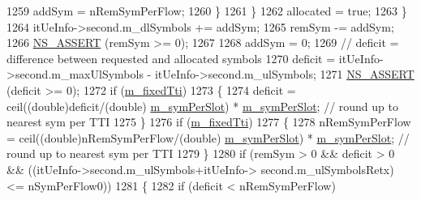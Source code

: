 \begin{DoxyCode}
1259                                                         addSym = nRemSymPerFlow;
1260                                                 \}
1261                                         \}
1262                                         allocated = \textcolor{keyword}{true};
1263                                 \}
1264                                 itUeInfo->second.m\_dlSymbols += addSym;
1265                                 remSym -= addSym;
1266                                 \hyperlink{assert_8h_a6dccdb0de9b252f60088ce281c49d052}{NS\_ASSERT} (remSym >= 0);
1267 
1268                                 addSym = 0;
1269                                 \textcolor{comment}{// deficit = difference between requested and allocated symbols}
1270                                 deficit = itUeInfo->second.m\_maxUlSymbols - itUeInfo->second.m\_ulSymbols;
1271                                 \hyperlink{assert_8h_a6dccdb0de9b252f60088ce281c49d052}{NS\_ASSERT} (deficit >= 0);
1272                                 \textcolor{keywordflow}{if} (\hyperlink{classns3_1_1MmWaveFlexTtiMacScheduler_aac44befc273f7bdb0f0be0efc3d05f34}{m\_fixedTti})
1273                                 \{
1274                                         deficit = ceil((\textcolor{keywordtype}{double})deficit/(\textcolor{keywordtype}{double})
      \hyperlink{classns3_1_1MmWaveFlexTtiMacScheduler_aa911d95e2956fcccca151a7353b8d42f}{m\_symPerSlot}) * \hyperlink{classns3_1_1MmWaveFlexTtiMacScheduler_aa911d95e2956fcccca151a7353b8d42f}{m\_symPerSlot}; \textcolor{comment}{// round up to nearest sym per TTI}
1275                                 \}
1276                                 \textcolor{keywordflow}{if} (\hyperlink{classns3_1_1MmWaveFlexTtiMacScheduler_aac44befc273f7bdb0f0be0efc3d05f34}{m\_fixedTti})
1277                                 \{
1278                                         nRemSymPerFlow = ceil((\textcolor{keywordtype}{double})nRemSymPerFlow/(\textcolor{keywordtype}{double})
      \hyperlink{classns3_1_1MmWaveFlexTtiMacScheduler_aa911d95e2956fcccca151a7353b8d42f}{m\_symPerSlot}) * \hyperlink{classns3_1_1MmWaveFlexTtiMacScheduler_aa911d95e2956fcccca151a7353b8d42f}{m\_symPerSlot}; \textcolor{comment}{// round up to nearest sym per TTI}
1279                                 \}
1280                                 \textcolor{keywordflow}{if} (remSym > 0 && deficit > 0 && ((itUeInfo->second.m\_ulSymbols+itUeInfo->
      second.m\_ulSymbolsRetx) <= nSymPerFlow0))
1281                                 \{
1282                                         \textcolor{keywordflow}{if} (deficit < nRemSymPerFlow)

\end{DoxyCode}
